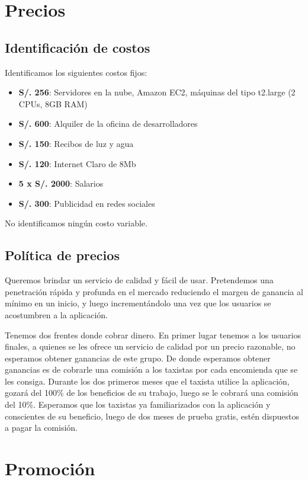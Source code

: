 \section{Precios}

\subsection{Identificación de costos}
\label{sec:costos}
Identificamos los siguientes costos fijos:

\begin{itemize}
\item \textbf{S/. 256}: Servidores en la nube, Amazon EC2, máquinas del tipo t2.large (2 CPUs, 8GB RAM)
\item \textbf{S/. 600}: Alquiler de la oficina de desarrolladores
\item \textbf{S/. 150}: Recibos de luz y agua
\item \textbf{S/. 120}: Internet Claro de 8Mb
\item \textbf{5 x S/. 2000}: Salarios
\item \textbf{S/. 300}: Publicidad en redes sociales
\end{itemize}

No identificamos ningún costo variable.

\subsection{Política de precios}

Queremos brindar un servicio de calidad y fácil de usar. Pretendemos una penetración rápida y profunda en el mercado reduciendo el margen de ganancia al mínimo en un inicio, y luego incrementándolo una vez que los usuarios se acostumbren a la aplicación.

Tenemos dos frentes donde cobrar dinero. En primer lugar tenemos a los usuarios finales, a quienes se les ofrece un servicio de calidad por un precio razonable, no esperamos obtener ganancias de este grupo. De donde esperamos obtener ganancias es de cobrarle una comisión a los taxistas por cada encomienda que se les consiga. Durante los dos primeros meses que el taxista utilice la aplicación, gozará del 100\% de los beneficios de su trabajo, luego se le cobrará una comisión del 10\%. Esperamos que los taxistas ya familiarizados con la aplicación y conscientes de su beneficio, luego de dos meses de prueba gratis, estén dispuestos a pagar la comisión.


\section{Promoción}
